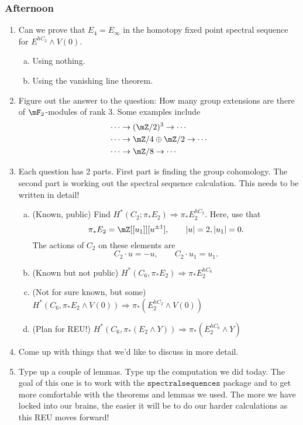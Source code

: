 \subsubsection{Afternoon}
\begin{enumerate}
    \item Can we prove that $E_4 = E_\infty$ in the homotopy fixed point spectral sequence for $E^{hC_2}\wedge V(0)$. 
    \begin{enumerate}[a.]
        \item Using nothing. 
        \item Using the vanishing line theorem. 
    \end{enumerate}
    \item Figure out the answer to the question: How many group extensions are there of $\mF_2$-modules of rank 3. Some examples include 
    \begin{align*}
        \cdots & \to (\mZ/2)^3\to \cdots\\
        \cdots & \to \mZ/4\oplus \mZ/2 \to \cdots\\
        \cdots & \to \mZ/8\to \cdots
    \end{align*}
    \item Each question has 2 parts. First part is finding the group cohomology. The second part is working out the spectral sequence calculation. This needs to be written in detail!
    \begin{enumerate}[a.]
        \item (Known, public) Find $H^\ast(C_2;\pi_\ast E_2)\Rightarrow \pi_\ast E_2^{hC_2}$. Here, use that $$\pi_\ast E_2 = \mZ[[u_1]][u^{\pm 1}], \qquad \abs{u}=2, \abs{u_1}=0.$$ The actions of $C_2$ on these elements are $$C_2\cdot u = -u, \qquad C_2\cdot u_1 = u_1.$$ 
        \item (Known but not public) $H^\ast(C_6, \pi_\ast E_2)\Rightarrow \pi_\ast E_2^{hC_6}$
        \item (Not for sure known, but some) $H^\ast(C_6,\pi_\ast E_2\wedge V(0))\Rightarrow \pi_\ast(E_2^{hC_2}\wedge V(0))$
        \item (Plan for REU!) $H^\ast(C_6,\pi_\ast(E_2\wedge Y))\Rightarrow \pi_\ast(E_2^{hC_6}\wedge Y)$
    \end{enumerate}
    
    \item Come up with things that we'd like to discuss in more detail. 
    \item Type up a couple of lemmas. Type up the computation we did today. The goal of this one is to work with the $\texttt{spectralsequences}$ package and to get more comfortable with the theorems and lemmas we used. The more we have locked into our brains, the easier it will be to do our harder calculations as this REU moves forward! 
\end{enumerate}
